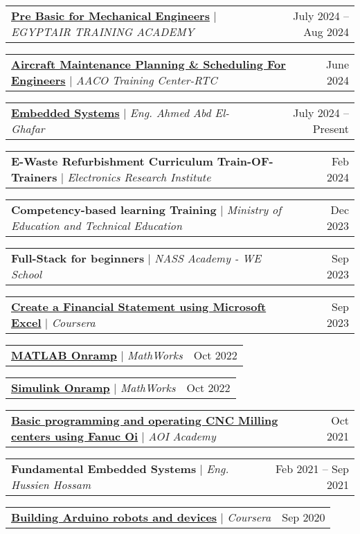 \documentclass[letterpaper,11pt]{article}
\makeatletter
\newcommand{\resumeProjectHeading}[2]{
    \item
    \begin{tabular*}{0.97\textwidth}{l@{\extracolsep{\fill}}r}
      \small#1 & #2 \\
    \end{tabular*}\vspace{-7pt}
}
\makeatother
\begin{document}
    \resumeProjectHeading
      {\textbf{\href{https://training.egyptair.com/CRM/Catalog/42400}{Pre Basic for Mechanical Engineers}} $|$ \emph{EGYPTAIR TRAINING ACADEMY}}{July 2024 -- Aug 2024}

    \resumeProjectHeading
      {\textbf{\href{https://training.egyptair.com/CRM/Catalog/55200}{Aircraft Maintenance Planning \& Scheduling For Engineers}} $|$ \emph{AACO Training Center-RTC}}{June 2024}
    
    \resumeProjectHeading
      {\textbf{\href{https://docs.google.com/document/d/1X7FlRX-Re-GHMI3wuXc9e37jJEGl_DlxNb-6NCMlmgo/edit?usp=sharing}{Embedded Systems}} $|$ \emph{Eng. Ahmed Abd El-Ghafar}}{July 2024 -- Present}
    
    \resumeProjectHeading
      {\textbf{E-Waste Refurbishment Curriculum Train-OF-Trainers} $|$ \emph{Electronics Research Institute}}{Feb 2024}

    \resumeProjectHeading
      {\textbf{Competency-based learning Training} $|$ \emph{Ministry of Education and Technical Education}}{Dec 2023}

    \resumeProjectHeading
      {\textbf{Full-Stack for beginners} $|$ \emph{NASS Academy - WE School}}{Sep 2023}
    
    \resumeProjectHeading
      {\textbf{\href{https://www.coursera.org/projects/create-financial-statement-using-microsoft-excel}{Create a Financial Statement using Microsoft Excel}} $|$ \emph{Coursera}}{Sep 2023}

    \resumeProjectHeading
      {\textbf{\href{https://matlabacademy.mathworks.com/details/matlab-onramp/gettingstarted}{MATLAB Onramp}} $|$ \emph{MathWorks}}{Oct 2022}
    
    \resumeProjectHeading
      {\textbf{\href{https://matlabacademy.mathworks.com/details/simulink-onramp/simulink}{Simulink Onramp}} $|$ \emph{MathWorks}}{Oct 2022}

    \resumeProjectHeading
      {\textbf{\href{https://drive.google.com/drive/folders/1gKIz-PYpO2zrjnvkzoYVhijYoGJP7P9j?usp=sharing}{Basic programming and operating CNC Milling centers using Fanuc Oi}} $|$ \emph{AOI Academy}}{Oct 2021}

    \resumeProjectHeading
      {\textbf{Fundamental Embedded Systems} $|$ \emph{Eng. Hussien Hossam}}{Feb 2021 -- Sep 2021}
  
    \resumeProjectHeading
      {\textbf{\href{https://www.coursera.org/learn/arduino}{Building Arduino robots and devices}} $|$ \emph{Coursera}}{Sep 2020}
      
\end{document}
